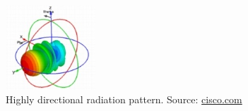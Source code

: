 
\begin{figure}[htbp]
	\centering
	\includegraphics[width=0.3\textwidth]{./figures/antennaPattern.jpg}
	\caption{Highly directional radiation pattern. {\footnotesize Source: \url{cisco.com}}}
	\label{fig:antenna}
\end{figure}

